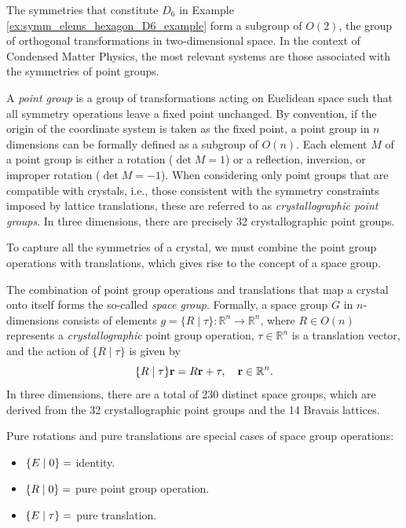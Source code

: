 The symmetries that constitute \(D_6\) in Example \ref{ex:symm_elems_hexagon_D6_example} form a subgroup of \(O(2)\), the group of orthogonal transformations in two-dimensional space. In the context of Condensed Matter Physics, the most relevant systems are those associated with the symmetries of point groups.
\begin{definition} \label{def:point_group}
A \textit{point group} is a group of transformations acting on Euclidean space such that all symmetry operations leave a fixed point unchanged. By convention, if the origin of the coordinate system is taken as the fixed point, a point group in \(n\) dimensions can be formally defined as a subgroup of \(O(n)\). Each element \(M\) of a point group is either a rotation (\(\det M = 1\)) or a reflection, inversion, or improper rotation (\(\det M = -1\)). When considering only point groups that are compatible with crystals, i.e., those consistent with the symmetry constraints imposed by lattice translations, these are referred to as \textit{crystallographic point groups}. In three dimensions, there are precisely 32 crystallographic point groups.
\end{definition}

To capture all the symmetries of a crystal, we must combine the point group operations with translations, which gives rise to the concept of a space group.

\begin{definition} \label{def:space_group}
The combination of point group operations and translations that map a crystal onto itself forms the so-called \textit{space group}. Formally, a space group \(G\) in \(n\)-dimensions consists of elements \(g = \{R \mid \tau\}: \mathbb{R}^n \to \mathbb{R}^n\), where \(R \in O(n)\) represents a \textit{crystallographic} point group operation, \(\tau \in \mathbb{R}^n\) is a translation vector, and the action of $\{R \mid \tau\}$ is given by
\begin{equation} \label{eq:space_group_action_def}
\{R \mid \tau\} {\vb{r}} = R {\vb{r}} + \tau, \quad {\vb{r}} \in \mathbb{R}^n.
\end{equation}
In three dimensions, there are a total of 230 distinct space groups, which are derived from the 32 crystallographic point groups and the 14 Bravais lattices.
\end{definition}


Pure rotations and pure translations are special cases of space group operations:
\begin{itemize}
\item $\{ E \mid 0 \} =$ identity.
\item $\{ R \mid 0 \} =$ pure point group operation.
\item $\{ E \mid \tau \} =$ pure translation.
\end{itemize}

